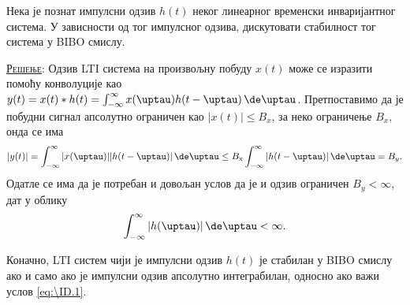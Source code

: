 \PID \label{z:bibo_imp}
Нека је познат импулсни одзив $h(t)$ неког линеарног временски инваријантног система.
У зависности од тог импулсног одзива, дискутовати стабилност тог система у BIBO смислу.
\vspace*{2mm}

\textsc{\underline{Решење}}: Одзив LTI система на произвољну побуду $x(t)$ може се изразити 
помоћу конволуције као 
$y(t) = x(t) \ast h(t) = \int_{-\infty}^{\infty} x(\uptau) h(t - \uptau )\, \de \uptau$. Претпоставимо да је 
побудни сигнал апсолутно ограничен као $|x(t)| \leq B_{x}$, за неко ограничење $B_x$, онда се има 
\begin{equation}
    |y(t)| = \int_{-\infty}^{\infty} |x(\uptau)| |h(t - \uptau )|\, \de \uptau \leq 
    B_{\rm x} \int_{-\infty}^{\infty} |h(t - \uptau )|\, \de \uptau = B_{y}.
\end{equation}
Одатле се има да је потребан и довољан услов да је и одзив ограничен $B_y < \infty$, дат у облику
\begin{equation}
\int_{-\infty}^{\infty} |h(\uptau )|\, \de \uptau < \infty. \label{eq:\ID.1}
\end{equation}

Коначно, LTI систем  чији је импулсни одзив $h(t)$ је стабилан у BIBO смислу ако и само ако је
импулсни одзив апсолутно интеграбилан, односно ако важи услов \eqref{eq:\ID.1}.

